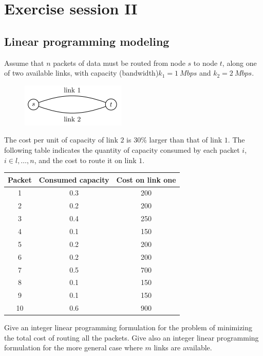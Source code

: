 \documentclass[12pt, a4paper]{report}
\newtheorem[style=M,bodystyle=\normalfont]{theorem}{Theorem}
\newtheorem[style=M,bodystyle=\normalfont]{corollary}{Corollary}
\newtheorem[style=M,bodystyle=\normalfont]{lemma}{Lemma}
\newtheorem[style=M,bodystyle=\normalfont]{definition}{Definition}
\begin{document}
\newpage

\chapter{Exercise session II}
    \section*{Linear programming modeling}
        Assume that $n$ packets of data must be routed from node $s$ to node $t$, along one of two available links, with capacity (bandwidth)$ k_1 = 1 \: Mbps$ and $k_2 = 2 \: Mbps$. 
        \begin{figure}[H]
            \centering
            \includegraphics[width=0.3\linewidth]{images/link.png}
        \end{figure}
        The cost per unit of capacity of link $2$ is $30\%$ larger than that of link $1$. The following table indicates the quantity of capacity consumed by each packet 
        $i$, $i \in {l,\dots,n}$, and the cost to route it on link $1$. 
        \begin{table}[H]
            \centering
            \begin{tabular}{c|cc}
            \textbf{Packet} & \textbf{Consumed capacity} & \textbf{Cost on link one} \\ \hline
            1               & 0.3                        & 200                       \\
            2               & 0.2                        & 200                       \\
            3               & 0.4                        & 250                       \\
            4               & 0.1                        & 150                       \\
            5               & 0.2                        & 200                       \\
            6               & 0.2                        & 200                       \\
            7               & 0.5                        & 700                       \\
            8               & 0.1                        & 150                       \\
            9               & 0.1                        & 150                       \\
            10              & 0.6                        & 900                      
            \end{tabular}
        \end{table}
        Give an integer linear programming formulation for the problem of minimizing the total cost of routing all the packets. Give also an integer linear programming formulation for 
        the more general case where $m$ links are available. 
\end{document}
